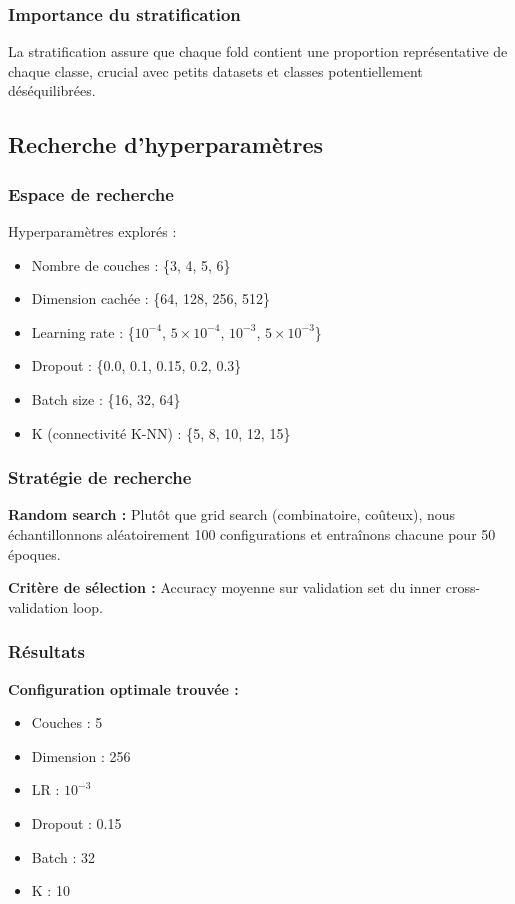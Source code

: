 \subsubsection{Importance du stratification}

La stratification assure que chaque fold contient une proportion représentative de chaque classe, crucial avec petits datasets et classes potentiellement déséquilibrées.

\subsection{Recherche d'hyperparamètres}

\subsubsection{Espace de recherche}

Hyperparamètres explorés :
\begin{itemize}
    \item Nombre de couches : \{3, 4, 5, 6\}
    \item Dimension cachée : \{64, 128, 256, 512\}
    \item Learning rate : \{$10^{-4}$, $5 \times 10^{-4}$, $10^{-3}$, $5 \times 10^{-3}$\}
    \item Dropout : \{0.0, 0.1, 0.15, 0.2, 0.3\}
    \item Batch size : \{16, 32, 64\}
    \item K (connectivité K-NN) : \{5, 8, 10, 12, 15\}
\end{itemize}

\subsubsection{Stratégie de recherche}

\textbf{Random search :}
Plutôt que grid search (combinatoire, coûteux), nous échantillonnons aléatoirement 100 configurations et entraînons chacune pour 50 époques.

\textbf{Critère de sélection :}
Accuracy moyenne sur validation set du inner cross-validation loop.

\subsubsection{Résultats}

\textbf{Configuration optimale trouvée :}
\begin{itemize}
    \item Couches : 5
    \item Dimension : 256
    \item LR : $10^{-3}$
    \item Dropout : 0.15
    \item Batch : 32
    \item K : 10
\end{itemize}


